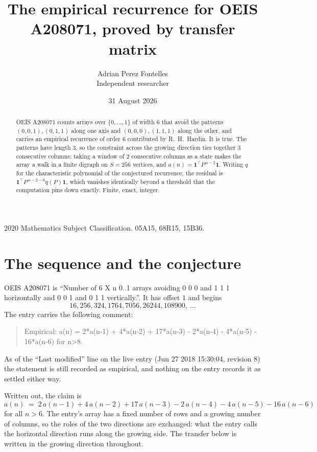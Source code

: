 \documentclass[11pt,a4paper]{article}
\title{The empirical recurrence for OEIS A208071, proved by transfer matrix}
\author{Adrian Perez Fontelles\\ \small Independent researcher}
\date{31 August 2026}
\theoremstyle{plain}
\theoremstyle{definition}
\begin{document}
\maketitle

\begin{abstract}
OEIS A208071 counts arrays over $\{0,\dots,1\}$ of width $6$ that avoid the patterns
$(0,0,1), (0,1,1)$ along one axis and $(0,0,0), (1,1,1)$ along the other, and carries an empirical recurrence of
order $6$ contributed by R.~H.~Hardin. It is true. The patterns have length $3$, so
the constraint across the growing direction ties together $3$ consecutive columns: taking a
window of $2$ consecutive columns as a state makes the array a walk in a finite digraph
on $S=256$ vertices, and $a(n)=\mathbf{1}^{\!\top}P^{\,n-2}\mathbf{1}$. Writing $q$
for the characteristic polynomial of the conjectured recurrence, the residual is
$\mathbf{1}^{\!\top}P^{\,n-2-6}q(P)\mathbf{1}$, which vanishes identically
beyond a threshold that the computation pins down exactly. Finite, exact, integer.
\end{abstract}

\noindent\small 2020 Mathematics Subject Classification. 05A15, 68R15, 15B36.\normalsize

\section{The sequence and the conjecture}

OEIS A208071 is ``Number of 6 X n 0..1 arrays avoiding 0 0 0 and 1 1 1 horizontally and 0 0 1 and 0 1 1 vertically.''. It has offset
$1$ and begins
\[
16, 256, 324, 1764, 7056, 26244, 108900,\ \dots
\]
The entry carries the following comment:
\begin{quote}\small
Empirical: a(n) = 2*a(n-1) + 4*a(n-2) + 17*a(n-3) - 2*a(n-4) - 4*a(n-5) - 16*a(n-6) for n>8.
\end{quote}
As of the ``Last modified'' line on the live entry (Jun 27 2018 15:30:04, revision
8) the statement is still recorded as empirical, and nothing on the entry
records it as settled either way.

Written out, the claim is
\begin{equation}\label{eq:conj}
a(n)\;=\;2\,a(n-1) + 4\,a(n-2) + 17\,a(n-3) - 2\,a(n-4) - 4\,a(n-5) - 16\,a(n-6)
\end{equation}
for all $n>6$. The entry's array has a fixed number of rows and a growing number of
columns, so the roles of the two directions are exchanged: what the entry calls the
horizontal direction runs along the growing side. The transfer below is written in the
growing direction throughout.
\end{document}
